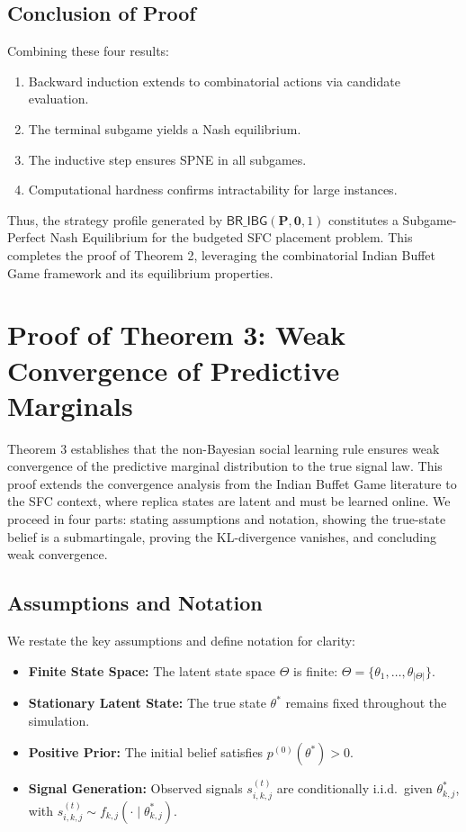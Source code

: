 \documentclass[journal]{IEEEtran}
\theoremstyle{plain}
\theoremstyle{definition}
\theoremstyle{remark}
\begin{document}
\subsection{Conclusion of Proof}
\label{app:proof_thm2_sec5}

Combining these four results:
\begin{enumerate}
    \item Backward induction extends to combinatorial actions via candidate evaluation.
    \item The terminal subgame yields a Nash equilibrium.
    \item The inductive step ensures SPNE in all subgames.
    \item Computational hardness confirms intractability for large instances.
\end{enumerate}

Thus, the strategy profile generated by $\textsf{BR\_IBG}(\mathbf{P}, \mathbf{0}, 1)$ constitutes a Subgame-Perfect Nash Equilibrium for the budgeted SFC placement problem. This completes the proof of Theorem 2, leveraging the combinatorial Indian Buffet Game framework and its equilibrium properties.


\section{Proof of Theorem 3: Weak Convergence of Predictive Marginals}
\label{app:proof_thm3}

Theorem 3 establishes that the non-Bayesian social learning rule ensures weak convergence of the predictive marginal distribution to the true signal law. This proof extends the convergence analysis from the Indian Buffet Game literature to the SFC context, where replica states are latent and must be learned online. We proceed in four parts: stating assumptions and notation, showing the true-state belief is a submartingale, proving the KL-divergence vanishes, and concluding weak convergence.

\subsection{Assumptions and Notation}
\label{app:proof_thm3_sec1}

We restate the key assumptions and define notation for clarity:
\begin{itemize}
    \item \textbf{Finite State Space:} The latent state space $\Theta$ is finite: $\Theta = \{\theta_1, \dots, \theta_{|\Theta|}\}$.
    \item \textbf{Stationary Latent State:} The true state $\theta^*$ remains fixed throughout the simulation.
    \item \textbf{Positive Prior:} The initial belief satisfies $p^{(0)}(\theta^*) > 0$.
    \item \textbf{Signal Generation:} Observed signals $s_{i,k,j}^{(t)}$ are conditionally i.i.d.\ given $\theta_{k,j}^*$, with $s_{i,k,j}^{(t)} \sim f_{k,j}(\cdot \mid \theta_{k,j}^*)$.
\end{itemize}
\end{document}
